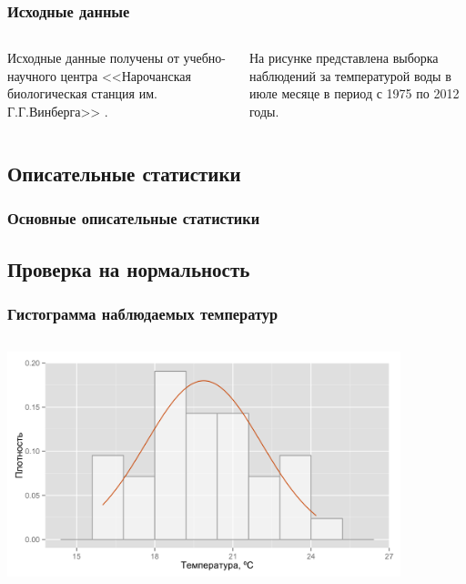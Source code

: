 \documentclass[10pt,pdf,aspectratio=169]{beamer}
\begin{document}
\begin{frame}
  \frametitle{Исходные данные}   %
  \begin{columns}[c]
  \column{2in}  %
  Исходные данные получены от учебно-научного центра <<Нарочанская биологическая станция им. Г.Г.Винберга>> .

  На рисунке представлена выборка наблюдений за температурой воды в июле месяце в период с 1975 по 2012 годы.
  \column{3in}
  \end{columns}
\end{frame}

\subsection{Описательные статистики}

\begin{frame}
  \frametitle{Основные описательные статистики}   %

  

\end{frame}

\subsection{Проверка на нормальность}

\begin{frame}
  \frametitle{Гистограмма наблюдаемых температур}   %
   \begin{columns}[c]
   \column{4.5in}
  \includegraphics[width=4.5in]{../../figures/original/histogram.png}
  \end{columns}
\end{frame}
\end{document}
